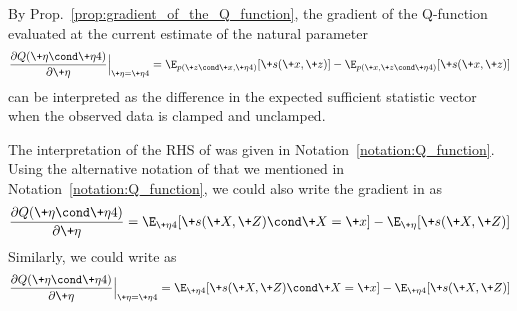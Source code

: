 \documentclass{article} %
\newcommand{\sufficientStatsFunction}{\+s}
\newcommand{\naturalParam}{\+\eta}
\begin{document}
\begin{corollary}
By Prop.~\ref{prop:gradient_of_the_Q_function}, the gradient of the Q-function evaluated at the current estimate of the natural parameter
%
\begin{align}
\frac{\partial Q(\naturalParam \cond \naturalParam^^t)}{\partial \naturalParam} \Bigr|_{\naturalParam = \naturalParam^^t} =  \E_{p(\+z \cond \+x, \naturalParam^^t)}[\sufficientStatsFunction(\+x,\+z)] - 	\E_{p(\+x, \+z \cond \naturalParam^^t)}[\sufficientStatsFunction(\+x,\+z)] 
\label{eqn:gradient_of_Q_function_as_difference_in_expected_sufficient_stats_with_clamped_and_unclamped_data}
\end{align}
%
can be interpreted as the difference in the expected sufficient statistic vector when the observed data is clamped and unclamped.
\end{corollary}



\begin{notation}
The interpretation of the RHS of  was given in Notation~\ref{notation:Q_function}.     Using the alternative notation of \citet{miller2011why} that we mentioned in Notation~\ref{notation:Q_function}, we could also write the gradient in  as 
 \begin{align}
 \frac{\partial Q(\naturalParam \cond \naturalParam^^t)}{\partial \naturalParam} =  \E_{\naturalParam^^t}[\sufficientStatsFunction(\+X,\+Z) \cond \+X=\+x] - 	\E_{\naturalParam}[\sufficientStatsFunction(\+X,\+Z)]
 \label{eqn:gradient_of_Q_function_for_EM_in_jeff_millers_notation}
 \end{align}
 Similarly, we could write  as
 \begin{align}
 \frac{\partial Q(\naturalParam \cond \naturalParam^^t)}{\partial \naturalParam} \Bigr|_{\naturalParam = \naturalParam^^t} =  \E_{\naturalParam^^t}[\sufficientStatsFunction(\+X,\+Z) \cond \+X=\+x] - 	\E_{\naturalParam^^t}[\sufficientStatsFunction(\+X,\+Z)]
 \label{eqn:the_gradient_of_the_Q_function_evaluated_at_the_current_parameter_and_using_jeffs_notation}
 \end{align}
\end{notation}
\end{document}
